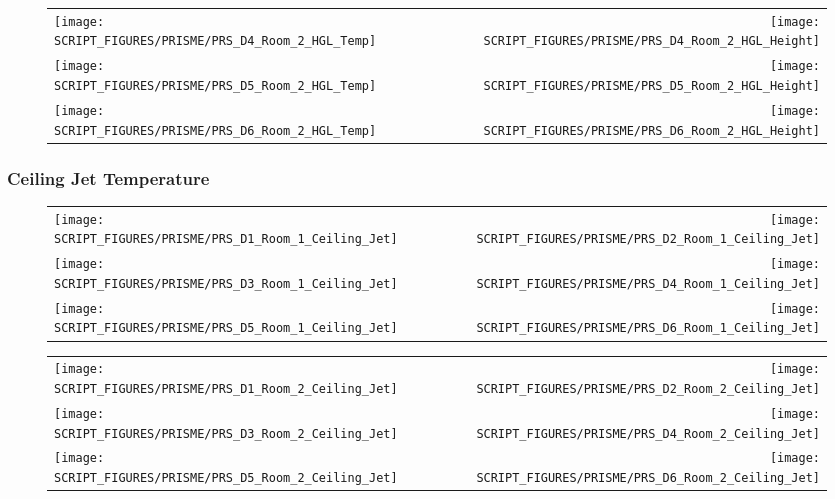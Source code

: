 \begin{figure}[p]
\begin{tabular*}{\textwidth}{l@{\extracolsep{\fill}}r}
\texttt{[image: SCRIPT\_FIGURES/PRISME/PRS\_D4\_Room\_2\_HGL\_Temp]} &
\texttt{[image: SCRIPT\_FIGURES/PRISME/PRS\_D4\_Room\_2\_HGL\_Height]} \\
\texttt{[image: SCRIPT\_FIGURES/PRISME/PRS\_D5\_Room\_2\_HGL\_Temp]} &
\texttt{[image: SCRIPT\_FIGURES/PRISME/PRS\_D5\_Room\_2\_HGL\_Height]} \\
\texttt{[image: SCRIPT\_FIGURES/PRISME/PRS\_D6\_Room\_2\_HGL\_Temp]} &
\texttt{[image: SCRIPT\_FIGURES/PRISME/PRS\_D6\_Room\_2\_HGL\_Height]}
\end{tabular*}
\label{PRISME_HGL_4}
\end{figure}

\clearpage

\subsubsection{Ceiling Jet Temperature}

\begin{figure}[!ht]
\begin{tabular*}{\textwidth}{l@{\extracolsep{\fill}}r}
\texttt{[image: SCRIPT\_FIGURES/PRISME/PRS\_D1\_Room\_1\_Ceiling\_Jet]} &
\texttt{[image: SCRIPT\_FIGURES/PRISME/PRS\_D2\_Room\_1\_Ceiling\_Jet]} \\
\texttt{[image: SCRIPT\_FIGURES/PRISME/PRS\_D3\_Room\_1\_Ceiling\_Jet]} &
\texttt{[image: SCRIPT\_FIGURES/PRISME/PRS\_D4\_Room\_1\_Ceiling\_Jet]} \\
\texttt{[image: SCRIPT\_FIGURES/PRISME/PRS\_D5\_Room\_1\_Ceiling\_Jet]} &
\texttt{[image: SCRIPT\_FIGURES/PRISME/PRS\_D6\_Room\_1\_Ceiling\_Jet]}
\end{tabular*}
\label{PRISME_Ceiling_Jet_Room_1}
\end{figure}

\begin{figure}[p]
\begin{tabular*}{\textwidth}{l@{\extracolsep{\fill}}r}
\texttt{[image: SCRIPT\_FIGURES/PRISME/PRS\_D1\_Room\_2\_Ceiling\_Jet]} &
\texttt{[image: SCRIPT\_FIGURES/PRISME/PRS\_D2\_Room\_2\_Ceiling\_Jet]} \\
\texttt{[image: SCRIPT\_FIGURES/PRISME/PRS\_D3\_Room\_2\_Ceiling\_Jet]} &
\texttt{[image: SCRIPT\_FIGURES/PRISME/PRS\_D4\_Room\_2\_Ceiling\_Jet]} \\
\texttt{[image: SCRIPT\_FIGURES/PRISME/PRS\_D5\_Room\_2\_Ceiling\_Jet]} &
\texttt{[image: SCRIPT\_FIGURES/PRISME/PRS\_D6\_Room\_2\_Ceiling\_Jet]}
\end{tabular*}
\label{PRISME_Ceiling_Jet_Room_2}
\end{figure}

